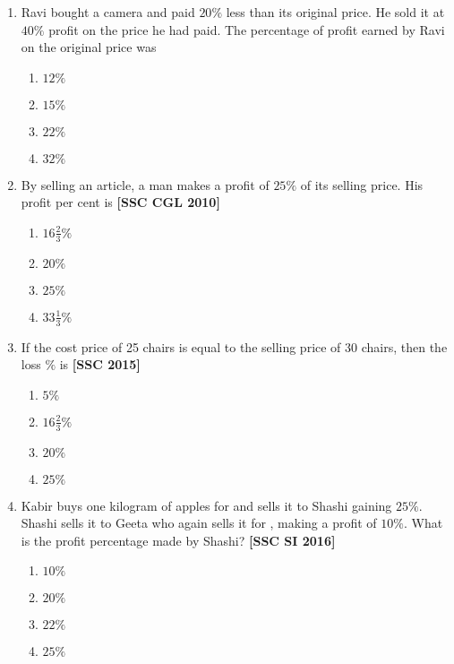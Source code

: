 \documentclass[twocolumn]{article}
\begin{document}
\begin{enumerate}
        \item Ravi bought a camera and paid $20 \%$ less than its original price. He sold it at $40 \%$ profit on the price he had paid. The percentage of profit earned by Ravi on the original price was
            \begin{enumerate}
                \item $12 \%$
                \item $15 \%$
                \item $22 \%$
                \item $32 \%$
            \end{enumerate}
            
        \item By selling an article, a man makes a profit of $25 \%$ of its selling price. His profit per cent is \hfill {\bf[SSC CGL 2010]}
            \begin{enumerate}
                \item $16 \frac{2}{3} \%$
                \item $20 \%$
                \item $25 \%$
                \item $33 \frac{1}{3} \%$
            \end{enumerate}
            
        \item If the cost price of 25 chairs is equal to the selling price of 30 chairs, then the loss $\%$ is \hfill {\bf[SSC 2015]}
            \begin{enumerate}
                \item $5 \%$
                \item $16 \frac{2}{3} \%$
                \item $20 \%$
                \item $25 \%$
            \end{enumerate}
            
        \item Kabir buys one kilogram of apples for  and sells it to Shashi gaining $25 \%$. Shashi sells it to Geeta who again sells it for , making a profit of $10 \%$. What is the profit percentage made by Shashi? \hfill {\bf[SSC SI 2016]}
            \begin{enumerate}
                \item $10 \%$
                \item $20 \%$
                \item $22 \%$
                \item $25 \%$
            \end{enumerate}
            

\end{enumerate}
\end{document}
